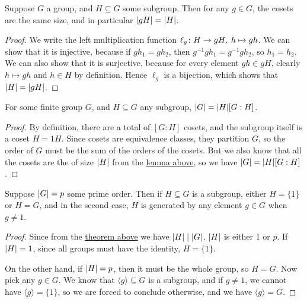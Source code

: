 \begin{lemma}\label{lem:order-coset}
    Suppose \(G\) a group, and \(H \subseteq G\) some subgroup.
    Then for any \(g \in G\),
    the cosets are the same size,
    and in particular \(\abs{gH} = \abs{H}\).
\end{lemma}
\begin{proof}
    We write the left multiplication function
    \(\ell_g\colon H\to gH,\;h\mapsto gh\).
    We can show that it is injective,
    because if \(gh_1 = gh_2\),
    then \(g^{-1}gh_1 = g^{-1}gh_2\),
    so \(h_1 = h_2\).
    We can also show that it is surjective,
    because for every element \(gh \in gH\),
    clearly \(h \mapsto gh\) and \(h \in H\) by definition.
    Hence \(\ell_g\) is a bijection,
    which shows that \(\abs{H} = \abs{gH}\).
\end{proof}
\begin{theorem}\label{thm:lagrange}
    For some finite group \(G\), and \(H \subseteq G\) any subgroup,
    \(\abs{G} = \abs{H}[G:H]\).
\end{theorem}
\begin{proof}
    By definition, there are a total of \([G:H]\) cosets,
    and the subgroup itself is a coset \(H = 1H\).
    Since cosets are equivalence classes,
    they partition \(G\),
    so the order of \(G\) must be the sum of the orders of the cosets.
    But we also know that all the cosets are the of size \(\abs{H}\)
    from the \hyperref[lem:order-coset]{lemma above},
    so we have \(\abs{G} = \abs{H}[G:H]\).
\end{proof}
\begin{corollary}\label{cor:prime-order-subgroup}
    Suppose \(\abs{G} = p\) some prime order.
    Then if \(H \subseteq G\) is a subgroup,
    either \(H = \{1\}\) or \(H = G\),
    and in the second case,
    \(H\) is generated by any element \(g \in G\) when \(g \neq 1\).
\end{corollary}
\begin{proof}
    Since from the \hyperref[thm:lagrange]{theorem above}
    we have \(\abs{H}\mid\abs{G}\),
    \(\abs{H}\) is either 1 or \(p\).
    If \(\abs{H} = 1\), since all groups must have the identity,
    \(H = \{1\}\).

    On the other hand, if \(\abs{H} = p\),
    then it must be the whole group, so \(H = G\).
    Now pick any \(g \in G\).
    We know that \(\langle g \rangle \subseteq G\) is a subgroup,
    and if \(g \neq 1\),
    we cannot have \(\langle g \rangle = \{1\}\),
    so we are forced to conclude otherwise,
    and we have \(\langle g \rangle = G\).
\end{proof}
